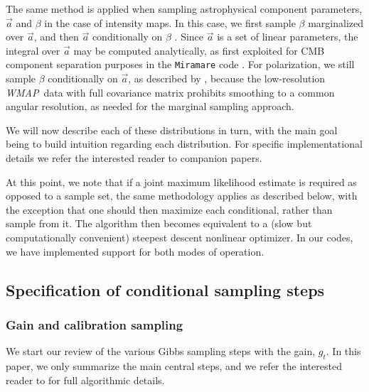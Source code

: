 \documentclass[onecolumn]{aa}
\def\WMAP{\emph{WMAP}}
\renewcommand{\a}[0]{\vec{a}}
\begin{document}
The same method is applied when sampling astrophysical component
parameters, $\a$ and $\beta$ in the case of intensity maps. In this case, we first
sample $\beta$ marginalized over $\a$, and then $\a$ conditionally on
$\beta$ \citep{bp13}. Since $\a$ is a set of linear parameters, the
integral over $\a$ may be computed analytically, as first exploited
for CMB component separation purposes in the \texttt{Miramare} code
\citep{stompor:2008,stivoli:2010}. For polarization, we still sample
$\beta$ conditionally on $\a$, as described by \citet{bp14}, because
the low-resolution \WMAP\ data with full covariance matrix prohibits
smoothing to a common angular resolution, as needed for the marginal
sampling approach.

We will now describe each of these distributions in turn, with the
main goal being to build intuition regarding each distribution. For
specific implementational details we refer the interested reader to
companion papers.

At this point, we note that if a joint maximum likelihood estimate is
required as opposed to a sample set, the same methodology applies as
described below, with the exception that one should then maximize each
conditional, rather than sample from it. The algorithm then becomes
equivalent to a (slow but computationally convenient) steepest descent
nonlinear optimizer. In our codes, we have implemented support for
both modes of operation.

\subsection{Specification of conditional sampling steps}
\label{sec:conditionals}

\subsubsection{Gain and calibration sampling}
\label{sec:gain}

We start our review of the various Gibbs sampling steps with the gain,
$g_t$. In this paper, we only summarize the main central steps, and we
refer the interested reader to \citet{bp07} for full algorithmic
details.
\end{document}
